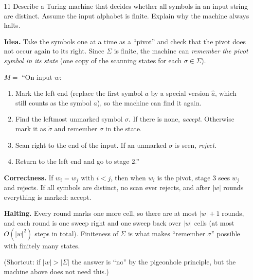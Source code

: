 \begin{question}{11}
Describe a Turing machine that decides whether all symbols in an input string are distinct. Assume the input alphabet is finite. Explain why the machine always halts.
\end{question}
\begin{soln}
\textbf{Idea.} Take the symbols one at a time as a ``pivot'' and check that the pivot does not occur again to its right. Since $\Sigma$ is finite, the machine can \emph{remember the pivot symbol in its state} (one copy of the scanning states for each $\sigma\in\Sigma$).

$M=$ ``On input $w$:
\begin{enumerate}
\item Mark the left end (replace the first symbol $a$ by a special version $\hat a$, which still counts as the symbol $a$), so the machine can find it again.
\item Find the leftmost unmarked symbol $\sigma$. If there is none, \emph{accept}. Otherwise mark it as $\dot\sigma$ and remember $\sigma$ in the state.
\item Scan right to the end of the input. If an unmarked $\sigma$ is seen, \emph{reject}.
\item Return to the left end and go to stage 2.''
\end{enumerate}

\textbf{Correctness.} If $w_i=w_j$ with $i<j$, then when $w_i$ is the pivot, stage 3 sees $w_j$ and rejects. If all symbols are distinct, no scan ever rejects, and after $|w|$ rounds everything is marked: accept.

\textbf{Halting.} Every round marks one more cell, so there are at most $|w|+1$ rounds, and each round is one sweep right and one sweep back over $|w|$ cells (at most $O(|w|^2)$ steps in total). Finiteness of $\Sigma$ is what makes ``remember $\sigma$'' possible with finitely many states.

(Shortcut: if $|w|>|\Sigma|$ the answer is ``no'' by the pigeonhole principle, but the machine above does not need this.)
\end{soln}

